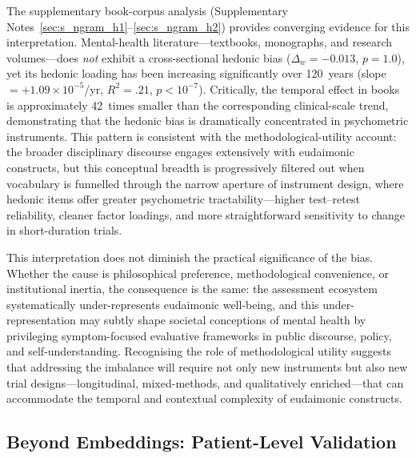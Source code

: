 \documentclass[12pt,a4paper]{article}
\begin{document}
The supplementary book-corpus analysis (Supplementary Notes~\ref{sec:s_ngram_h1}--\ref{sec:s_ngram_h2}) provides converging evidence for this interpretation.
Mental-health literature---textbooks, monographs, and research volumes---does \textit{not} exhibit a cross-sectional hedonic bias ($\Delta_w = -0.013$, $p = 1.0$), yet its hedonic loading has been increasing significantly over 120~years (slope $= +1.09 \times 10^{-5}$/yr, $R^2 = .21$, $p < 10^{-7}$).
Critically, the temporal effect in books is approximately 42~times smaller than the corresponding clinical-scale trend, demonstrating that the hedonic bias is dramatically concentrated in psychometric instruments.
This pattern is consistent with the methodological-utility account: the broader disciplinary discourse engages extensively with eudaimonic constructs, but this conceptual breadth is progressively filtered out when vocabulary is funnelled through the narrow aperture of instrument design, where hedonic items offer greater psychometric tractability---higher test--retest reliability, cleaner factor loadings, and more straightforward sensitivity to change in short-duration trials.

This interpretation does not diminish the practical significance of the bias.
Whether the cause is philosophical preference, methodological convenience, or institutional inertia, the consequence is the same: the assessment ecosystem systematically under-represents eudaimonic well-being, and this under-representation may subtly shape societal conceptions of mental health by privileging symptom-focused evaluative frameworks in public discourse, policy, and self-understanding.
Recognising the role of methodological utility suggests that addressing the imbalance will require not only new instruments but also new trial designs---longitudinal, mixed-methods, and qualitatively enriched---that can accommodate the temporal and contextual complexity of eudaimonic constructs.

\subsection{Beyond Embeddings: Patient-Level Validation}
\end{document}

